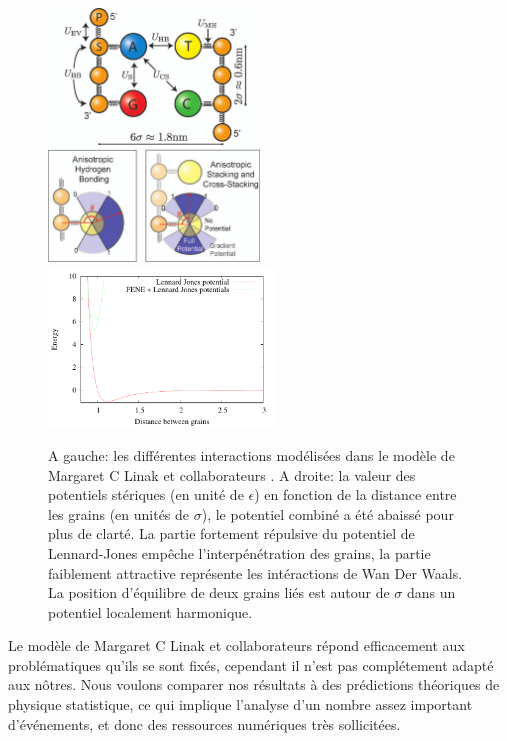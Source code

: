 \documentclass[a4paper,11pt]{article}
\begin{document}
\begin{figure}[H]
\begin{center}
\includegraphics[width=0.5\textwidth]{moldyn.jpg}\includegraphics[width=0.54\textwidth]{potentials.pdf}


\caption{A gauche: les différentes interactions modélisées dans le modèle de Margaret C Linak et collaborateurs \cite{jchem}. A droite: la valeur des potentiels stériques (en unité de $\epsilon$) en fonction de la distance entre les grains (en unités de $\sigma$), le potentiel combiné a été abaissé pour plus de clarté. La partie fortement répulsive du potentiel de Lennard-Jones empêche l'interpénétration des grains, la partie faiblement attractive représente les intéractions de Wan Der Waals. La position d'équilibre de deux grains liés est autour de $\sigma$ dans un potentiel localement harmonique.}
\label{moldyn}
\end{center}
\end{figure}

Le modèle de Margaret C Linak et collaborateurs \cite{jchem} répond efficacement aux problématiques qu'ils se sont fixés, cependant il n'est pas complétement adapté aux nôtres. Nous voulons comparer nos résultats à des prédictions théoriques de physique statistique, ce qui implique l'analyse d'un nombre assez important d'événements, et donc des ressources numériques très sollicitées.\\
\end{document}
